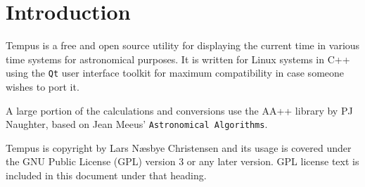 \section{Introduction}
Tempus is a free and open source utility for displaying the current time in various time systems for astronomical purposes. It is written for Linux systems in C++ using the \texttt{Qt} user interface toolkit for maximum compatibility in case someone wishes to port it.

A large portion of the calculations and conversions use the AA++ library by PJ Naughter, based on Jean Meeus' \texttt{Astronomical Algorithms}.

Tempus is copyright by Lars N{\ae}sbye Christensen and its usage is covered under the GNU Public License (GPL) version 3 or any later version. GPL license text is included in this document under that heading.

